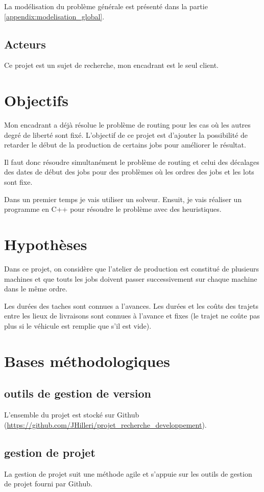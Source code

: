 La modélisation du problème générale est présenté dans la partie \autoref{appendix:modelisation_global}.

\subsection{Acteurs}
Ce projet est un sujet de recherche, mon encadrant est le seul client.

\section{Objectifs}
Mon encadrant a déjà résolue le problème de routing pour les cas où les autres degré de liberté sont fixé.
L'objectif de ce projet est d'ajouter la possibilité de retarder le début de la production de certains jobs 
    pour améliorer le résultat.

Il faut donc résoudre simultanément le problème de routing et celui des décalages des dates de début des jobs 
    pour des problèmes où les ordres des jobs et les lots sont fixe.

Dans un premier temps je vais utiliser un solveur.
Ensuit, je vais réaliser un programme en C++ pour résoudre le problème avec des heuristiques.

\section{Hypothèses}
Dans ce projet, on considère que l'atelier de production est constitué de plusieurs machines 
    et que touts les jobs doivent passer successivement sur chaque machine dans le même ordre.

Les durées des taches sont connues a l'avances.
Les durées et les coûts des trajets entre les lieux de livraisons sont connues à l'avance 
    et fixes (le trajet ne coûte pas plus si le véhicule est remplie que s'il est vide).


\section{Bases méthodologiques}
\subsection{outils de gestion de version}
L'ensemble du projet est stocké sur Github (\url{https://github.com/JHilleri/projet_recherche_developpement}).

\subsection{gestion de projet}
La gestion de projet suit une méthode agile et s'appuie sur les outils de gestion de projet fourni par Github.

